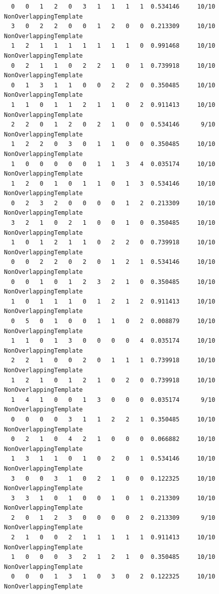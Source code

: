 \documentclass[12pt, titlepage]{report}
\theoremstyle{definition}
\begin{document}
{\begin{verbatim}
  0   0   1   2   0   3   1   1   1   1  0.534146     10/10      NonOverlappingTemplate
  3   0   2   2   0   0   1   2   0   0  0.213309     10/10      NonOverlappingTemplate
  1   2   1   1   1   1   1   1   1   0  0.991468     10/10      NonOverlappingTemplate
  0   2   1   1   0   2   2   1   0   1  0.739918     10/10      NonOverlappingTemplate
  0   1   3   1   1   0   0   2   2   0  0.350485     10/10      NonOverlappingTemplate
  1   1   0   1   1   2   1   1   0   2  0.911413     10/10      NonOverlappingTemplate
  2   2   0   1   2   0   2   1   0   0  0.534146      9/10      NonOverlappingTemplate
  1   2   2   0   3   0   1   1   0   0  0.350485     10/10      NonOverlappingTemplate
  1   0   0   0   0   0   1   1   3   4  0.035174     10/10      NonOverlappingTemplate
  1   2   0   1   0   1   1   0   1   3  0.534146     10/10      NonOverlappingTemplate
  0   2   3   2   0   0   0   0   1   2  0.213309     10/10      NonOverlappingTemplate
  3   2   1   0   2   1   0   0   1   0  0.350485     10/10      NonOverlappingTemplate
  1   0   1   2   1   1   0   2   2   0  0.739918     10/10      NonOverlappingTemplate
  0   0   2   2   0   2   0   1   2   1  0.534146     10/10      NonOverlappingTemplate
  0   0   1   0   1   2   3   2   1   0  0.350485     10/10      NonOverlappingTemplate
  1   0   1   1   1   0   1   2   1   2  0.911413     10/10      NonOverlappingTemplate
  0   5   0   1   0   0   1   1   0   2  0.008879     10/10      NonOverlappingTemplate
  1   1   0   1   3   0   0   0   0   4  0.035174     10/10      NonOverlappingTemplate
  2   2   1   0   0   2   0   1   1   1  0.739918     10/10      NonOverlappingTemplate
  1   2   1   0   1   2   1   0   2   0  0.739918     10/10      NonOverlappingTemplate
  1   4   1   0   0   1   3   0   0   0  0.035174      9/10      NonOverlappingTemplate
  0   0   0   0   3   1   1   2   2   1  0.350485     10/10      NonOverlappingTemplate
  0   2   1   0   4   2   1   0   0   0  0.066882     10/10      NonOverlappingTemplate
  1   3   1   1   0   1   0   2   0   1  0.534146     10/10      NonOverlappingTemplate
  3   0   0   3   1   0   2   1   0   0  0.122325     10/10      NonOverlappingTemplate
  3   3   1   0   1   0   0   1   0   1  0.213309     10/10      NonOverlappingTemplate
  2   0   1   2   3   0   0   0   0   2  0.213309      9/10      NonOverlappingTemplate
  2   1   0   0   2   1   1   1   1   1  0.911413     10/10      NonOverlappingTemplate
  1   0   0   0   3   2   1   2   1   0  0.350485     10/10      NonOverlappingTemplate
  0   0   0   1   3   1   0   3   0   2  0.122325     10/10      NonOverlappingTemplate

\end{verbatim}}
\end{document}
